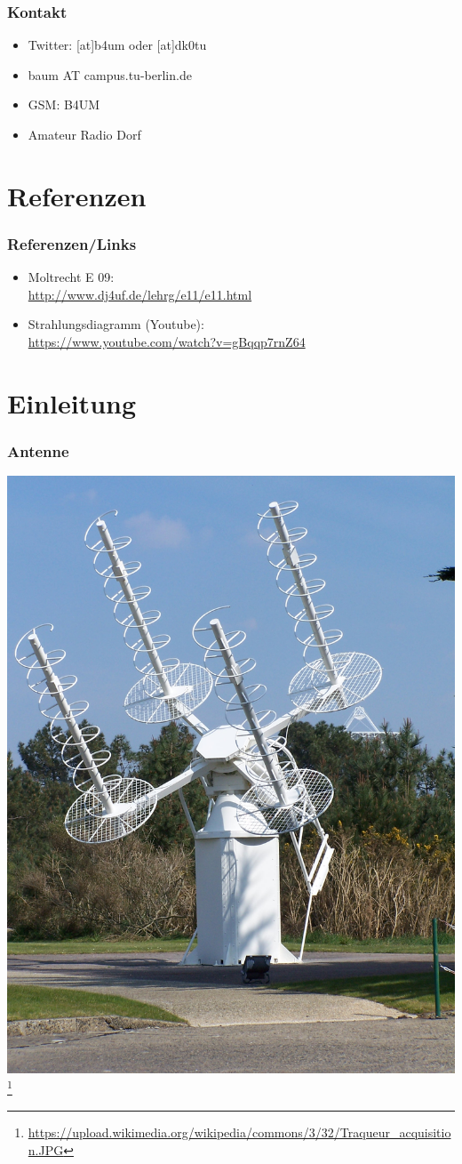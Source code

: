 \begin{frame}
    \frametitle{Kontakt}
    	\begin{itemize}
		\item Twitter: [at]b4um oder [at]dk0tu
		\item baum AT campus.tu-berlin.de
		\item GSM: B4UM
		\item Amateur Radio Dorf
    \end{itemize}
\end{frame}


\section*{Referenzen}

\begin{frame}
    \frametitle{Referenzen/Links}
    
    \footnotesize
    \begin{itemize}
        \item Moltrecht E 09: \\
              \url{http://www.dj4uf.de/lehrg/e11/e11.html}
        \item Strahlungsdiagramm (Youtube): \\
              \url{https://www.youtube.com/watch?v=gBqqp7rnZ64}
    \end{itemize}

\end{frame}



\section*{Einleitung}

\begin{frame}
    \frametitle{Antenne}
      \begin{center}
        \includegraphics[width=.5\textwidth]{e11/Traqueur_acquisition.JPG}
        \footnote{\tiny \url{https://upload.wikimedia.org/wikipedia/commons/3/32/Traqueur_acquisition.JPG}}
    \end{center}
\end{frame}
  

